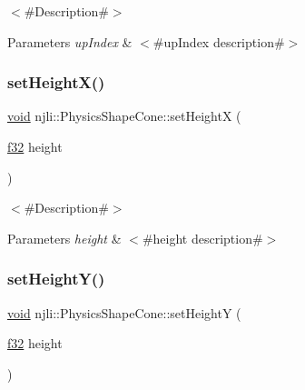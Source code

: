 $<$\#\+Description\#$>$


\begin{DoxyParams}{Parameters}
{\em up\+Index} & $<$\#up\+Index description\#$>$ \\
\hline
\end{DoxyParams}
\mbox{\label{classnjli_1_1_physics_shape_cone_a28c6c8539b9756348191fd0504512993}} 
\subsubsection{\texorpdfstring{set\+Height\+X()}{setHeightX()}}
{\footnotesize\ttfamily \mbox{\hyperlink{_thread_8h_af1e856da2e658414cb2456cb6f7ebc66}{void}} njli\+::\+Physics\+Shape\+Cone\+::set\+HeightX (\begin{DoxyParamCaption}\item[{\mbox{\hyperlink{_util_8h_a5f6906312a689f27d70e9d086649d3fd}{f32}}}]{height }\end{DoxyParamCaption})}

$<$\#\+Description\#$>$


\begin{DoxyParams}{Parameters}
{\em height} & $<$\#height description\#$>$ \\
\hline
\end{DoxyParams}
\mbox{\label{classnjli_1_1_physics_shape_cone_a6b504b0f28f39e21cf5ef9c07314b4ef}} 
\subsubsection{\texorpdfstring{set\+Height\+Y()}{setHeightY()}}
{\footnotesize\ttfamily \mbox{\hyperlink{_thread_8h_af1e856da2e658414cb2456cb6f7ebc66}{void}} njli\+::\+Physics\+Shape\+Cone\+::set\+HeightY (\begin{DoxyParamCaption}\item[{\mbox{\hyperlink{_util_8h_a5f6906312a689f27d70e9d086649d3fd}{f32}}}]{height }\end{DoxyParamCaption})}

